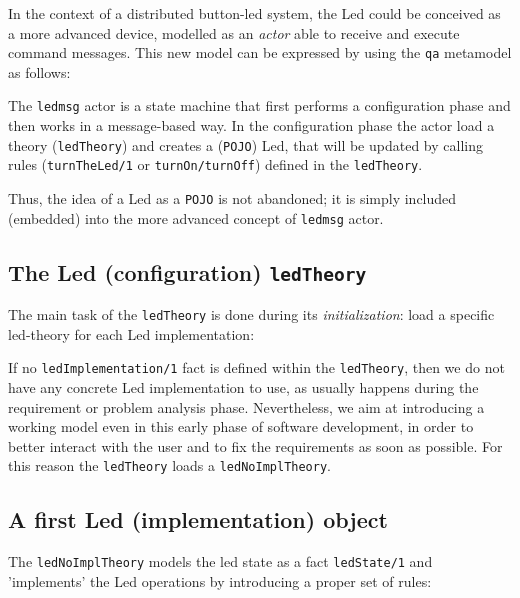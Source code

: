 In the context of a distributed button-led system, the Led could be conceived as a more advanced device, modelled as an \textit{actor} able to receive and execute command messages. 
%
This new model can be expressed by using the \texttt{qa} metamodel as follows:


The \texttt{ledmsg} actor is a state machine that first performs a configuration phase and then works in a message-based way.
% 
In the configuration phase the actor load a theory (\texttt{ledTheory}) and creates a (\texttt{POJO}) Led, that will be updated by calling \tuprolog{} rules (\texttt{turnTheLed/1} or \texttt{turnOn/turnOff}) defined in the \texttt{ledTheory}.

Thus, the idea of a Led as a \texttt{POJO} is not abandoned; it is simply included (embedded) into the more advanced concept of \texttt{ledmsg} actor.

\subsection{The Led (configuration) \texttt{ledTheory} }
The main task of the \texttt{ledTheory} is done during its \textit{initialization}: load a specific led-theory for each Led implementation:



If no \texttt{ledImplementation/1} fact is defined within the \texttt{ledTheory}, then we do not have any concrete Led implementation to use, as usually happens during the requirement or problem analysis phase. Nevertheless, we aim at introducing a working model even in this early phase of software development, in order to better interact with the user and to fix the requirements as soon as possible. For this reason the \texttt{ledTheory} loads a \texttt{ledNoImplTheory}. 

\subsection{A first Led (implementation) object}

The \texttt{ledNoImplTheory}  models the led state as a fact \texttt{ledState/1} and 'implements' the Led operations by introducing a proper set of rules:

 

